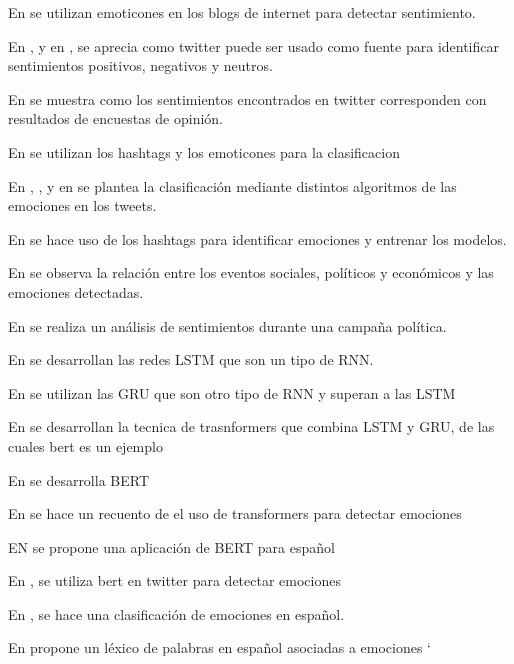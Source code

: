 En \cite{read2005using} se utilizan emoticones en los blogs de internet para detectar sentimiento.

En \cite{pak2010twitter}, \cite{kouloumpis2011twitter} y en \cite{go2009twitter}, \cite{barbosa2010robust} se aprecia como twitter puede ser usado como fuente para identificar sentimientos positivos, negativos y neutros.

En \cite{o2010tweets} se muestra como los sentimientos encontrados en twitter corresponden con resultados de encuestas de opinión.

En \cite{davidov2010enhanced} se utilizan los hashtags y los emoticones para la clasificacion


En \cite{hasan2014emotex}, , \cite{wang2012harnessing}y en \cite{roberts2012empatweet} se plantea la clasificación mediante distintos algoritmos de las emociones en los tweets.

En \cite{mohammad2012emotional} se hace uso de los hashtags para identificar emociones y entrenar los modelos.

En \cite{bollen2011modeling} se observa la relación entre los eventos sociales, políticos y económicos y las emociones detectadas.

En \cite{tumasjan2010predicting} se realiza un análisis de sentimientos durante una campaña política.

En \cite{hochreiter1997long} se desarrollan las redes LSTM que son un tipo de RNN.

En \cite{chung2014empirical} se utilizan las GRU que son otro tipo de RNN y superan a las LSTM

En \cite{vaswani2017attention} se desarrollan la tecnica de trasnformers que combina LSTM y GRU, de las cuales bert es un ejemplo

En \cite{devlin2018bert} se desarrolla BERT

En \cite{acheampong2021transformer} se hace un recuento de el uso de transformers para detectar emociones

EN \cite{canete2020spanish} se propone una aplicación de BERT para español

En \cite{gonzalez2021twilbert}, \cite{huang2019ana} se utiliza bert en twitter para  detectar emociones

En \cite{plaza2020improved}, \cite{gil2013combining} se hace una clasificación de emociones en español.


En \cite{sidorov2012empirical} propone un léxico de palabras en español asociadas a emociones
`








